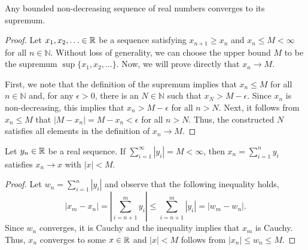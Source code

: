 \begin{theorem}
Any bounded non-decreasing sequence of real numbers converges to its supremum.
\end{theorem}
\begin{proof}
Let $x_1,x_2,\ldots \in \mathbb{R}$ be a sequence satisfying $x_{n+1} \geq x_n$ and $x_n \leq M < \infty$ for all $n\in \mathbb{N}$.
Without loss of generality, we can choose the upper bound $M$ to be the supremum $\sup \{x_1,x_2,\ldots\}$.
Now, we will prove directly that $x_n \to M$.

First, we note that the definition of the supremum implies that $x_n \leq M$ for all $n\in \mathbb{N}$ and, for any $\epsilon >0$, there is an $N\in \mathbb{N}$ such that $x_N > M-\epsilon$.
Since $x_n$ is non-decreasing, this implies that $x_n > M-\epsilon$ for all $n>N$.
Next, it follows from $x_n \leq M$ that $|M - x_n| = M-x_n < \epsilon$ for all $n>N$.
Thus, the constructed $N$ satisfies all elements in the definition of $x_n \to M$.
\end{proof}


\begin{lemma} \label{lem:abs_sum_convergence}
Let $y_n \in \mathbb{R}$ be a real sequence.
If $\sum_{i=1}^\infty |y_i| = M < \infty$, then $x_n = \sum_{i=1}^n y_i$ satisfies $x_n \to x$ with $|x|<M$.
\end{lemma}
\begin{proof}
Let $w_n = \sum_{i=1}^n |y_i|$ and observe that the following inequality holds,
\[|x_m - x_n| = \left| \sum_{i=n+1}^m y_i \right| \leq \sum_{i=n+1}^m |y_i| = | w_m - w_n|. \]
Since $w_n$ converges, it is Cauchy and %
the inequality implies that $x_m$ is Cauchy.
Thus, $x_n$ converges to some $x\in \mathbb{R}$ and $|x| < M$ follows from  $|x_n| \leq w_n \leq M$.
\end{proof}



